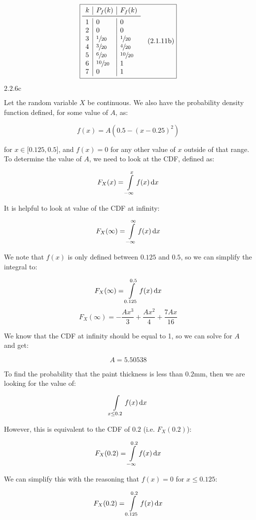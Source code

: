 \documentclass{article}
\newcommand{\problem}[2]{$\boxed{\text{#1.#2}}$}
\newcommand{\subsolution}[4]{\boxed{#4\quad(\text{#1.#2#3})}}
\renewcommand{\d}[1]{\,\textnormal{d}#1}
\begin{document}
\[
\subsolution{2.1}{11}{b}{\begin{array}{l|l|l}
k & P_f(k) & F_f(k) \\
\midrule
1 & 0 & 0 \\
2 & 0 & 0 \\
3 & \sfrac{1}{20} & \sfrac{1}{20} \\
4 & \sfrac{3}{20} & \sfrac{4}{20} \\
5 & \sfrac{6}{20} & \sfrac{10}{20} \\
6 & \sfrac{10}{20} & 1 \\
7 & 0 & 1 \\
\end{array}}
\]

%
\problem{2.2}{6c}

Let the random variable $X$ be continuous. We also have the
probability density function defined, for some value of $A$, as:

\[
f(x)=A(0.5-(x-0.25)^2)
\]

for $x\in\lbrack0.125,0.5\rbrack$, and $f(x)=0$ for any other value of
$x$ outside of that range. To determine the value of $A$, we need to
look at the CDF, defined as:

\[
F_X(x)=\int\limits_{-\infty}^xf(x)\d{x}
\]

It is helpful to look at value of the CDF at infinity:

\[
F_X(\infty)=\int\limits_{-\infty}^\infty f(x)\d{x}
\]

We note that $f(x)$ is only defined between $0.125$ and $0.5$, so we
can simplify the integral to:

\[
F_X(\infty)=\int\limits_{0.125}^{0.5} f(x)\d{x}
\] \[
F_X(\infty)=-\frac{A x^3}{3}+\frac{A x^2}{4}+\frac{7 A x}{16}
\]

We know that the CDF at infinity should be equal to 1, so we can solve
for $A$ and get:

\[
A=5.50538
\]

To find the probability that the paint thickness is less than $0.2$mm,
then we are looking for the value of:

\[
\int\limits_{x\le0.2} f(x)\d{x}
\]

However, this is equivalent to the CDF of $0.2$ (i.e. $F_X(0.2)$):

\[
F_X(0.2)=\int\limits_{-\infty}^{0.2}f(x)\d{x}
\]

We can simplify this with the reasoning that $f(x)=0$ for $x\le0.125$:

\[
F_X(0.2)=\int\limits_{0.125}^{0.2}f(x)\d{x}
\]
\end{document}

